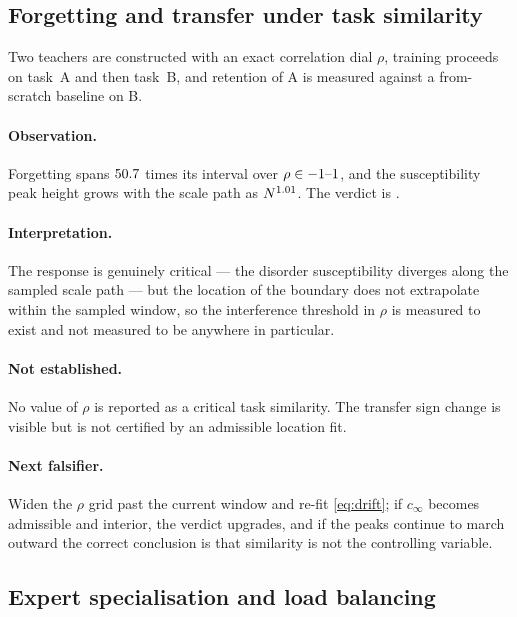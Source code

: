 \subsection{Forgetting and transfer under task similarity}

Two teachers are constructed with an exact correlation dial
$\rho$, training proceeds on task~A and then task~B, and retention of A is
measured against a from-scratch baseline on B.

\paragraph{Observation.} Forgetting spans
$50.7{}$ times its interval over
$\rho\in-1\text{--}1{}$, and the susceptibility peak
height grows with the scale path as $N^{1.01{}}$.
The verdict is \emph{\AtlasContinualForgettingVerdict{}}.

\paragraph{Interpretation.} The response is genuinely critical --- the disorder
susceptibility diverges along the sampled scale path --- but the location of
the boundary does not extrapolate within the sampled window, so the interference
threshold in $\rho$ is measured to exist and not measured to be anywhere in
particular.

\paragraph{Not established.} No value of $\rho$ is reported as a critical task
similarity. The transfer sign change is visible but is not certified by an
admissible location fit.

\paragraph{Next falsifier.} Widen the $\rho$ grid past the current window and
re-fit \eqref{eq:drift}; if $c_\infty$ becomes admissible and interior, the
verdict upgrades, and if the peaks continue to march outward the correct
conclusion is that similarity is not the controlling variable.

\subsection{Expert specialisation and load balancing}

